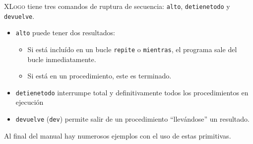\textsc{XLogo} tiene tres comandos de ruptura de secuencia: \texttt{alto},
\texttt{detienetodo} y \texttt{devuelve}.

\begin{itemize}
   \item \texttt{alto}  puede tener dos
      resultados:
      \begin{itemize}
         \item Si est\'a inclu\'ido en un bucle \texttt{repite}
             o \texttt{mientras},
             el programa sale del
            bucle inmediatamente.
         \item Si est\'a en un procedimiento, este es
            terminado.
      \end{itemize}
   \item \texttt{detienetodo} 
      interrumpe total y definitivamente todos los procedimientos en
      ejecuci\'on
   \item \texttt{devuelve} 
      (\texttt{dev})  permite salir de un
      procedimiento ``llev\'andose'' un resultado.
\end{itemize}
Al final del manual hay numerosos ejemplos con el uso de estas primitivas.
